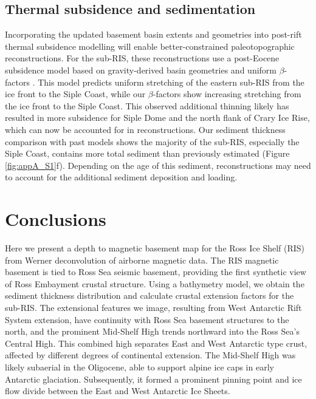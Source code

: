 \subsection{Thermal subsidence and sedimentation}
Incorporating the updated basement basin extents and geometries into post-rift thermal subsidence modelling will enable better-constrained paleotopographic reconstructions. For the sub-RIS, these reconstructions \citep{wilsonantarctic2012, paxmanreconstructions2019} use a post-Eocene subsidence model based on gravity-derived basin geometries and uniform $\beta$-factors \citep{wilsonwest2009}. This model predicts uniform stretching of the eastern sub-RIS from the ice front to the Siple Coast, while our $\beta$-factors show increasing stretching from the ice front to the Siple Coast. This observed additional thinning likely has resulted in more subsidence for Siple Dome and the north flank of Crary Ice Rise, which can now be accounted for in reconstructions. Our sediment thickness comparison with past models \citep[Section \ref{appA:text_S6},][]{wilsonwest2009} shows the majority of the sub-RIS, especially the Siple Coast, contains more total sediment than previously estimated (Figure \ref{fig:appA_S1}f). Depending on the age of this sediment, reconstructions may need to account for the additional sediment deposition and loading.

\section{Conclusions}
Here we present a depth to magnetic basement map for the Ross Ice Shelf (RIS) from Werner deconvolution of airborne magnetic data. The RIS magnetic basement is tied to Ross Sea seismic basement, providing the first synthetic view of Ross Embayment crustal structure. Using a bathymetry model, we obtain the sediment thickness distribution and calculate crustal extension factors for the sub-RIS. The extensional features we image, resulting from West Antarctic Rift System extension, have continuity with Ross Sea basement structures to the north, and the prominent Mid-Shelf High trends northward into the Ross Sea’s Central High. This combined high separates East and West Antarctic type crust, affected by different degrees of continental extension. The Mid-Shelf High was likely subaerial in the Oligocene, able to support alpine ice caps in early Antarctic glaciation. Subsequently, it formed a prominent pinning point and ice flow divide between the East and West Antarctic Ice Sheets. \\

